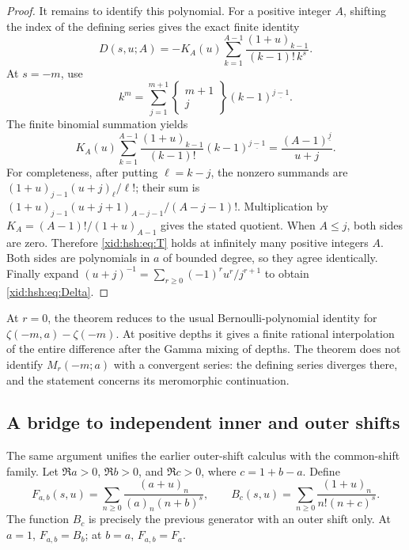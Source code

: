 \begin{proof}
It remains to identify this polynomial. For a positive integer $A$,
shifting the index of the defining series gives the exact finite
identity
\[
 D(s,u;A)=-K_A(u)\sum_{k=1}^{A-1}
           \frac{(1+u)_{k-1}}{(k-1)!\,k^s}.
\]
At $s=-m$, use
\[
 k^m=\sum_{j=1}^{m+1}
       {\left\{\begin{matrix}m+1\\j\end{matrix}\right\}}
         (k-1)^{\underline{j-1}}.
\]
The finite binomial summation yields
\[
 K_A(u)\sum_{k=1}^{A-1}
       \frac{(1+u)_{k-1}}{(k-1)!}
              (k-1)^{\underline{j-1}}
       =\frac{(A-1)^{\underline j}}{u+j}.
\]
For completeness, after putting $\ell=k-j$, the nonzero summands are
$(1+u)_{j-1}(u+j)_\ell/\ell!$; their sum is
$(1+u)_{j-1}(u+j+1)_{A-j-1}/(A-j-1)!$.
Multiplication by $K_A=(A-1)!/(1+u)_{A-1}$ gives the stated quotient.
When $A\le j$, both sides are zero. Therefore \eqref{xid:hsh:eq:T} holds
at infinitely many positive integers $A$. Both sides are polynomials
in $a$ of bounded degree, so they agree identically. Finally expand
$(u+j)^{-1}=\sum_{r\ge0}(-1)^ru^r/j^{r+1}$ to obtain
\eqref{xid:hsh:eq:Delta}.
\end{proof}

At $r=0$, the theorem reduces to the usual Bernoulli-polynomial
identity for $\zeta(-m,a)-\zeta(-m)$. At positive depths it gives a
finite rational interpolation of the entire difference after the
Gamma mixing of depths. The theorem does not identify
$M_r(-m;a)$ with a convergent series: the defining series diverges
there, and the statement concerns its meromorphic continuation.

\subsection{A bridge to independent inner and outer shifts}

The same argument unifies the earlier outer-shift calculus with the
common-shift family. Let $\Re a>0$, $\Re b>0$, and
$\Re c>0$, where $c=1+b-a$. Define
\[
 F_{a,b}(s,u)=\sum_{n\ge0}\frac{(a+u)_n}{(a)_n(n+b)^s},
 \qquad B_c(s,u)=\sum_{n\ge0}\frac{(1+u)_n}{n!(n+c)^s}.
\]
The function $B_c$ is precisely the previous generator with an outer
shift only. At $a=1$, $F_{a,b}=B_b$; at $b=a$, $F_{a,b}=F_a$.

